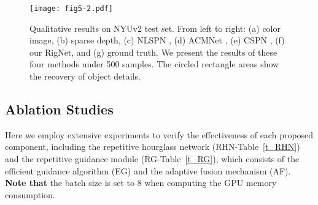 \documentclass[runningheads]{llncs}
\begin{document}
\begin{figure}[t]
  \centering
  \texttt{[image: fig5-2.pdf]}\\
  \caption{Qualitative results on NYUv2 test set. From left to right: (a) color image, (b) sparse depth, (c) NLSPN \cite{park2020nonlocal}, (d) ACMNet \cite{zhao2021adaptive}, (e) CSPN \cite{2018Learning}, (f) our RigNet, and (g) ground truth. We present the results of these four methods under 500 samples. The circled rectangle areas show the recovery of object details.}\label{Fig.5}
\end{figure}


\begin{table}[t]
\centering
\renewcommand\arraystretch{1.2}
\caption{Ablation studies of RHN on KITTI validation set. \textcolor{blue}{18-1} denotes that we use 1 ResNet-18 as backbone, which is also the baseline. `Deeper'/`More' denotes that we conduct single\&deeper/multiple\&tandem hourglass units as backbone. Note that each layer of RHN$_{2,3}$ only contains two convolutions while the RHN$_{1}$ employs ResNet.}
\label{t_RHN}
\end{table}

\subsection{Ablation Studies}
Here we employ extensive experiments to verify the effectiveness of each proposed component, including the repetitive hourglass network (RHN-Table~\ref{t_RHN}) and the repetitive guidance module (RG-Table~\ref{t_RG}), which consists of the efficient guidance algorithm (EG) and the adaptive fusion mechanism (AF). \textbf{Note that} the batch size is set to 8 when computing the GPU memory consumption.
\end{document}
